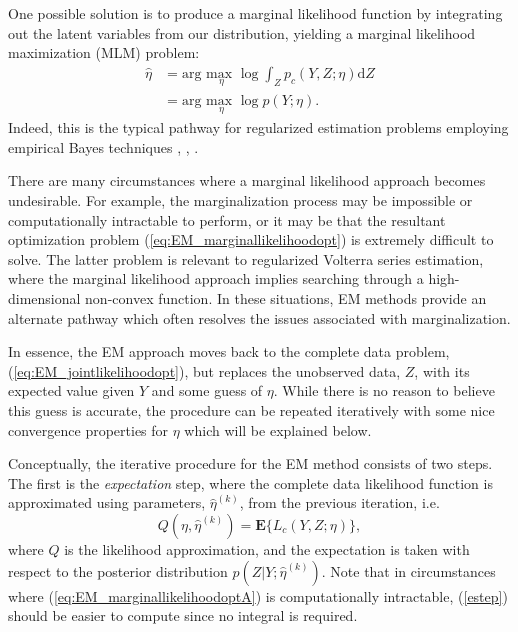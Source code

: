 One possible solution is to produce a marginal likelihood function by integrating out the latent variables from our distribution, yielding a marginal likelihood maximization (MLM) problem:
\begin{align}
\hat{\eta} &= \text{arg } \underset{\eta}{\text{max }} \log \int_Z p_c(Y,Z; \eta) \text{d}Z \label{eq:EM_marginallikelihoodoptA} \\
&= \text{arg } \underset{\eta}{\text{max }} \log p(Y; \eta).
\label{eq:EM_marginallikelihoodopt}
\end{align}
Indeed, this is the typical pathway for regularized estimation problems employing empirical Bayes techniques \cite{Pillonetto2010}, \cite{Birpoutsoukis2017}, \cite{Lataire2016}.

There are many circumstances where a marginal likelihood approach becomes undesirable. For example, the marginalization process may be impossible or computationally intractable to perform, or it may be that the resultant optimization problem (\ref{eq:EM_marginallikelihoodopt}) is extremely difficult to solve. The latter problem is relevant to regularized Volterra series estimation, where the marginal likelihood approach implies searching through a high-dimensional non-convex function. In these situations, EM methods provide an alternate pathway which often resolves the issues associated with marginalization.

In essence, the EM approach moves back to the complete data problem, (\ref{eq:EM_jointlikelihoodopt}), but replaces the unobserved data, $Z$, with its expected value given $Y$ and some guess of $\eta$. While there is no reason to believe this guess is accurate, the procedure can be repeated iteratively with some nice convergence properties for $\eta$ which will be explained below.  

Conceptually, the iterative procedure for the EM method consists of two steps. The first is the \emph{expectation} step, where the complete data likelihood function is approximated using parameters, $\hat{\eta}^{(k)}$, from the previous iteration, i.e.
\begin{equation}
\label{estep}
Q(\eta,\hat{\eta}^{(k)}) = \textbf{E}\{  L_c(Y,Z;\eta) \},
\end{equation}
where $Q$ is the likelihood approximation, and the expectation is taken with respect to the posterior distribution $p(Z|Y; \hat{\eta}^{(k)})$. Note that in circumstances where (\ref{eq:EM_marginallikelihoodoptA}) is computationally intractable, (\ref{estep}) should be easier to compute since no integral is required.

